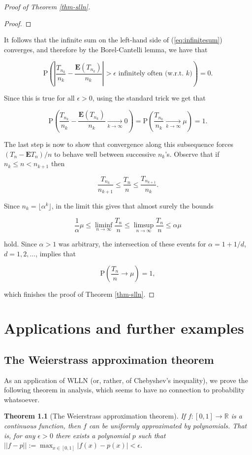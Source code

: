\documentclass[11pt]{report}
\newcommand{\R}{\mathbb{R}}
\theoremstyle{plain}
\newtheorem{thm}{Theorem}[chapter]
\theoremstyle{definition}
\begin{document}
\begin{proof}[Proof of Theorem \ref{thm-slln}]
\begin{proof}
\end{proof}

It follows that the infinite sum on the left-hand
side of (\ref{eq:infinitesum}) converges, and therefore by
the Borel-Cantelli lemma, we have that

\[
\mathrm{P}\left(\left|\frac{T_{n_k}}{n_k} - \frac{\mathbf{E}(T_{n_k})}{n_k}\right| > \epsilon\textrm{ infinitely often (w.r.t. } k \textrm{)}\right)
=0.
\]

Since this is true for all $\epsilon>0$, using the
standard trick we get that

\[
\mathrm{P}\left(\frac{T_{n_k}}{n_k} - \frac{\mathbf{E}(T_{n_k})}{n_k}\xrightarrow[k\to\infty]{}0\right) =
\mathrm{P}\left(\frac{T_{n_k}}{n_k}  \xrightarrow[k\to\infty]{}\mu\right) =  1.
\]

The last step is now to show that convergence along
this subsequence forces $(T_n-\mathbf{E} T_n)/n$ to
behave well between successive $n_k$'s. Observe that
if $n_k \le n < n_{k+1}$ then

\[
\frac{T_{n_k}}{n_{k+1}} \le \frac{T_n}{n} \le \frac{T_{n_{k+1}}}{n_k}.
\]

Since $n_k=\lfloor \alpha^k\rfloor$, in the limit
this gives that almost surely the bounds

\[
\frac{1}{\alpha} \mu \le \liminf_{n\to\infty} \frac{T_n}{n} \le \limsup_{n\to\infty} \frac{T_n}{n}
\le \alpha \mu
\]

hold. Since $\alpha>1$ was arbitrary, the
intersection of these events for $\alpha=1+1/d$,
$d=1,2,\ldots$, implies that

\[
\mathrm{P}\left( \frac{T_n}{n} \to\mu \right) = 1,
\]

which finishes the proof of Theorem \ref{thm-slln}.
\end{proof}

\chapter{Applications and further examples}

\section{The Weierstrass approximation theorem}
As an application of WLLN (or, rather, of Chebyshev's
inequality), we prove the following theorem in
analysis, which seems to have no connection to
probability whatsoever.

\begin{thm}[The Weierstrass approximation theorem]
If $f:[0,1]\to\R$ is a continuous function, then $f$
can be uniformly approximated by polynomials. That is,
for any $\epsilon>0$ there exists a polynomial $p$
such that
$||f-p||:=\max_{x\in[0,1]}|f(x)-p(x)|<\epsilon$.
\end{thm}
\end{document}
